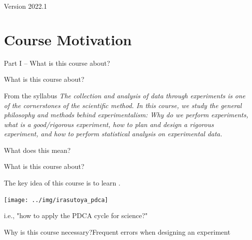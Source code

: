 \documentclass[aspectratio=169]{beamer}
\subtitle[Intro]{Topic 00 - Course Introduction}
\begin{document}
\begin{CJK}{UTF8}{ipxm}

\begin{frame}
  \maketitle

  \vfill

  \hfill Version 2022.1
\end{frame}

\section{Course Motivation}

\begin{frame}
  \begin{center}
    Part I -- What is this course about?
  \end{center}
\end{frame}

\begin{frame}{What is this course about?}

  \begin{block}{From the syllabus}
  \emph{The collection and analysis of data through experiments is one of the cornerstones of the scientific method. In this course, we study the general philosophy and methods behind experimentalism: Why do we perform experiments, what is a good/rigorous experiment, how to plan and design a rigorous experiment, and how to perform statistical analysis on experimental data.}
  \end{block}
  \bigskip

  What does this mean?
\end{frame}

\begin{frame}{What is this course about?}{}

  The key idea of this course is to learn .\bigskip

  \begin{center}
    \texttt{[image: ../img/irasutoya\_pdca]}
  \end{center}\bigskip

  i.e., "how to apply the PDCA cycle for science?"
\end{frame}

\begin{frame}{Why is this course necessary?}{Frequent errors when designing an experiment}


\end{frame}
\end{CJK}
\end{document}
